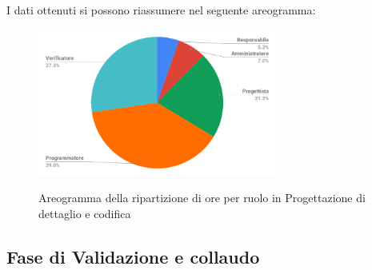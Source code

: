 \pagebreak
I dati ottenuti si possono riassumere nel seguente areogramma:
\begin{figure}[H] 
			\centering 
				\includegraphics[width=0.7\textwidth]{res/images/areogramma_dettaglio.png}\\
				\caption{Areogramma della ripartizione di ore per ruolo in Progettazione di dettaglio e codifica}
			\label{AreogrammaDettaglio}
\end{figure}


\subsection{Fase di Validazione e collaudo}
